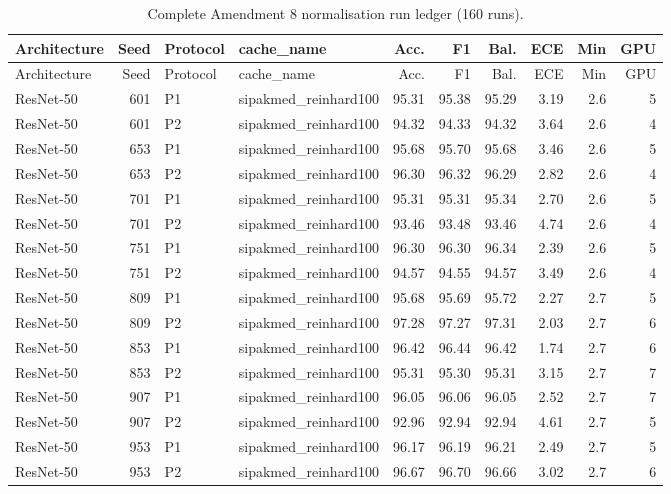 {\scriptsize
\setlength{\tabcolsep}{3.5pt}
\begin{longtable}{lrllrrrrrr}
\caption{Complete Amendment 8 normalisation run ledger (160 runs).}\label{r:tab:ledger-normalization}\\
\toprule
Architecture & Seed & Protocol & cache\_name & Acc. & F1 & Bal. & ECE & Min & GPU \\
\midrule
\endfirsthead
\toprule
Architecture & Seed & Protocol & cache\_name & Acc. & F1 & Bal. & ECE & Min & GPU \\
\midrule
\endhead
\bottomrule
\endfoot
ResNet-50 & 601 & P1 & sipakmed\_reinhard100 & 95.31 & 95.38 & 95.29 & 3.19 & 2.6 & 5 \\
ResNet-50 & 601 & P2 & sipakmed\_reinhard100 & 94.32 & 94.33 & 94.32 & 3.64 & 2.6 & 4 \\
ResNet-50 & 653 & P1 & sipakmed\_reinhard100 & 95.68 & 95.70 & 95.68 & 3.46 & 2.6 & 5 \\
ResNet-50 & 653 & P2 & sipakmed\_reinhard100 & 96.30 & 96.32 & 96.29 & 2.82 & 2.6 & 4 \\
ResNet-50 & 701 & P1 & sipakmed\_reinhard100 & 95.31 & 95.31 & 95.34 & 2.70 & 2.6 & 5 \\
ResNet-50 & 701 & P2 & sipakmed\_reinhard100 & 93.46 & 93.48 & 93.46 & 4.74 & 2.6 & 4 \\
ResNet-50 & 751 & P1 & sipakmed\_reinhard100 & 96.30 & 96.30 & 96.34 & 2.39 & 2.6 & 5 \\
ResNet-50 & 751 & P2 & sipakmed\_reinhard100 & 94.57 & 94.55 & 94.57 & 3.49 & 2.6 & 4 \\
ResNet-50 & 809 & P1 & sipakmed\_reinhard100 & 95.68 & 95.69 & 95.72 & 2.27 & 2.7 & 5 \\
ResNet-50 & 809 & P2 & sipakmed\_reinhard100 & 97.28 & 97.27 & 97.31 & 2.03 & 2.7 & 6 \\
ResNet-50 & 853 & P1 & sipakmed\_reinhard100 & 96.42 & 96.44 & 96.42 & 1.74 & 2.7 & 6 \\
ResNet-50 & 853 & P2 & sipakmed\_reinhard100 & 95.31 & 95.30 & 95.31 & 3.15 & 2.7 & 7 \\
ResNet-50 & 907 & P1 & sipakmed\_reinhard100 & 96.05 & 96.06 & 96.05 & 2.52 & 2.7 & 7 \\
ResNet-50 & 907 & P2 & sipakmed\_reinhard100 & 92.96 & 92.94 & 92.94 & 4.61 & 2.7 & 5 \\
ResNet-50 & 953 & P1 & sipakmed\_reinhard100 & 96.17 & 96.19 & 96.21 & 2.49 & 2.7 & 5 \\
ResNet-50 & 953 & P2 & sipakmed\_reinhard100 & 96.67 & 96.70 & 96.66 & 3.02 & 2.7 & 6 \\

\end{longtable}}
